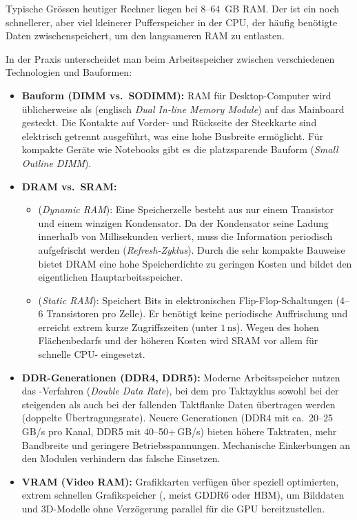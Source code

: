 Typische Grössen heutiger Rechner liegen bei 8--64~GB \gls{RAM}. Der  ist ein noch schnellerer, aber viel kleinerer Pufferspeicher in der \gls{CPU}, der häufig benötigte Daten zwischenspeichert, um den langsameren \gls{RAM} zu entlasten.

\begin{myexcursion}\label{exc:ram-typen}
    In der Praxis unterscheidet man beim Arbeitsspeicher zwischen verschiedenen Technologien und Bauformen:
    \begin{itemize}
        \item \textbf{Bauform (\gls{DIMM} vs.\ \gls{SODIMM}):} \gls{RAM} für Desktop-Computer wird üblicherweise als  (englisch \emph{Dual In-line Memory Module}) auf das Mainboard gesteckt. Die Kontakte auf Vorder- und Rückseite der Steckkarte sind elektrisch getrennt ausgeführt, was eine hohe Busbreite ermöglicht. Für kompakte Geräte wie Notebooks gibt es die platzsparende Bauform  (\emph{Small Outline DIMM}).
        \item \textbf{\gls{DRAM} vs.\ \gls{SRAM}:} 
        \begin{itemize}
            \item {} (\emph{Dynamic \gls{RAM}}): Eine Speicherzelle besteht aus nur einem Transistor und einem winzigen Kondensator. Da der Kondensator seine Ladung innerhalb von Millisekunden verliert, muss die Information periodisch aufgefrischt werden (\emph{Refresh-Zyklus}). Durch die sehr kompakte Bauweise bietet \gls{DRAM} eine hohe Speicherdichte zu geringen Kosten und bildet den eigentlichen Hauptarbeitsspeicher.
            \item {} (\emph{Static \gls{RAM}}): Speichert Bits in elektronischen Flip-Flop-Schaltungen (4--6 Transistoren pro Zelle). Er benötigt keine periodische Auffrischung und erreicht extrem kurze Zugriffszeiten (unter $1\,\mathrm{ns}$). Wegen des hohen Flächenbedarfs und der höheren Kosten wird \gls{SRAM} vor allem für schnelle \gls{CPU}- eingesetzt.
        \end{itemize}
        \item \textbf{\gls{DDR}-Generationen (\gls{DDR}4, \gls{DDR}5):} Moderne Arbeitsspeicher nutzen das -Verfahren (\emph{Double Data Rate}), bei dem pro Taktzyklus sowohl bei der steigenden als auch bei der fallenden Taktflanke Daten übertragen werden (doppelte Übertragungsrate). Neuere Generationen (\gls{DDR}4 mit ca.\ 20--25\,GB/s pro Kanal, \gls{DDR}5 mit 40--50+\,GB/s) bieten höhere Taktraten, mehr Bandbreite und geringere Betriebsspannungen. Mechanische Einkerbungen an den Modulen verhindern das falsche Einsetzen.
        \item \textbf{\gls{VRAM} (Video \gls{RAM}):} Grafikkarten verfügen über speziell optimierten, extrem schnellen Grafikspeicher (, meist GDDR6 oder HBM), um Bilddaten und 3D-Modelle ohne Verzögerung parallel für die \gls{GPU} bereitzustellen.
    \end{itemize}
\end{myexcursion}

